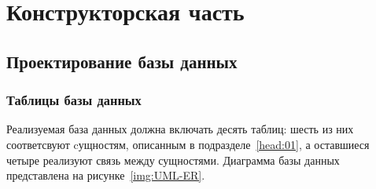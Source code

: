 \chapter{Конструкторская часть}

\section{Проектирование базы данных}
\subsection{Таблицы базы данных}

Реализуемая база данных должна включать десять таблиц: шесть из них соответсвуют
cущностям, описанным в подразделе~\ref{head:01}, а оставшиеся четыре реализуют
связь между сущностями. Диаграмма базы данных представлена на
рисунке~\ref{img:UML-ER}.


